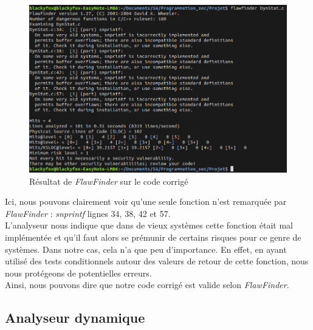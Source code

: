 \begin{figure}[H]
  \centering
  \includegraphics[width=.9\textwidth]{img/conc2.png}
  \caption{Résultat de \textit{FlawFinder} sur le code corrigé}
  \label{img:conc2}
\end{figure}
Ici, nous pouvons clairement voir qu'une seule fonction n'est remarquée par \textit{FlawFinder} : \textit{snprintf} lignes 34, 38, 42 et 57.\\
L'analyseur nous indique que dans de vieux systèmes cette fonction était mal implémentée et qu'il faut alors se prémunir de certains risques pour ce genre de systèmes. Dans notre cas, cela n'a que peu d'importance. En effet, en ayant utilisé des tests conditionnels autour des valeurs de retour de cette fonction, nous nous protégeons de potentielles erreurs.\\
Ainsi, nous pouvons dire que notre code corrigé est valide selon \textit{FlawFinder}.

\subsection{Analyseur dynamique}

